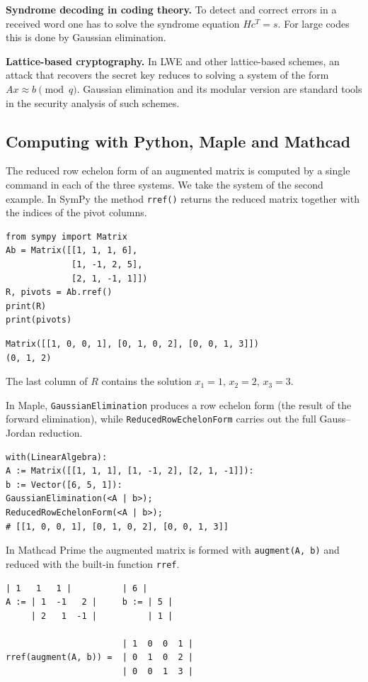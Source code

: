 \textbf{Syndrome decoding in coding theory.}
To detect and correct errors in a received word one has to solve the
syndrome equation $Hc^T=s$. For large codes this is done by Gaussian
elimination.

\textbf{Lattice-based cryptography.}
In LWE and other lattice-based schemes, an attack that recovers the secret
key reduces to solving a system of the form $Ax\approx b \pmod{q}$.
Gaussian elimination and its modular version are standard tools in the
security analysis of such schemes.

\subsection{Computing with Python, Maple and Mathcad}

The reduced row echelon form of an augmented matrix is computed by a single
command in each of the three systems. We take the system of the second
example. In SymPy the method \texttt{rref()} returns the reduced matrix
together with the indices of the pivot columns.
\begin{Verbatim}[fontsize=\footnotesize,frame=single,label={\small Python}]
from sympy import Matrix
Ab = Matrix([[1, 1, 1, 6],
             [1, -1, 2, 5],
             [2, 1, -1, 1]])
R, pivots = Ab.rref()
print(R)
print(pivots)
\end{Verbatim}
\begin{Verbatim}[fontsize=\footnotesize,frame=single,label={\small Output}]
Matrix([[1, 0, 0, 1], [0, 1, 0, 2], [0, 0, 1, 3]])
(0, 1, 2)
\end{Verbatim}
The last column of $R$ contains the solution $x_1=1$, $x_2=2$, $x_3=3$.

In Maple, \texttt{GaussianElimination} produces a row echelon form (the
result of the forward elimination), while \texttt{ReducedRowEchelonForm}
carries out the full Gauss–Jordan reduction.
\begin{Verbatim}[fontsize=\footnotesize,frame=single,label={\small Maple}]
with(LinearAlgebra):
A := Matrix([[1, 1, 1], [1, -1, 2], [2, 1, -1]]):
b := Vector([6, 5, 1]):
GaussianElimination(<A | b>);
ReducedRowEchelonForm(<A | b>);
# [[1, 0, 0, 1], [0, 1, 0, 2], [0, 0, 1, 3]]
\end{Verbatim}

In Mathcad Prime the augmented matrix is formed with \texttt{augment(A, b)}
and reduced with the built-in function \texttt{rref}.
\begin{Verbatim}[fontsize=\footnotesize,frame=single,label={\small Mathcad}]
     | 1   1   1 |          | 6 |
A := | 1  -1   2 |     b := | 5 |
     | 2   1  -1 |          | 1 |

                       | 1  0  0  1 |
rref(augment(A, b)) =  | 0  1  0  2 |
                       | 0  0  1  3 |
\end{Verbatim}

